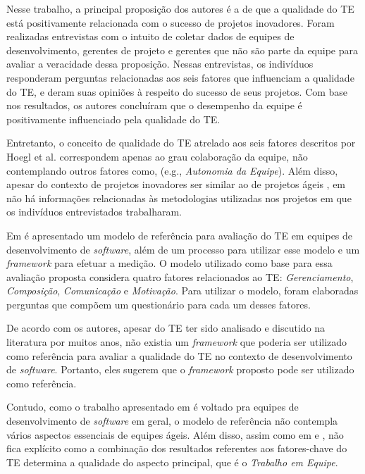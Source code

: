 Nesse trabalho, a principal proposição dos autores é a de que a qualidade do TE está positivamente relacionada com o sucesso de projetos inovadores. Foram realizadas entrevistas com o intuito de coletar dados de equipes de desenvolvimento, gerentes de projeto e gerentes que não são parte da equipe para avaliar a veracidade dessa proposição. Nessas entrevistas, os indivíduos responderam perguntas relacionadas aos seis fatores que influenciam a qualidade do TE, e deram suas opiniões à respeito do sucesso de seus projetos. Com base nos resultados, os autores concluíram que o desempenho da equipe é positivamente influenciado pela qualidade do TE.

Entretanto, o conceito de qualidade do TE atrelado aos seis fatores descritos por Hoegl et al. \cite{hoegl} correspondem apenas ao grau colaboração da equipe, não contemplando outros fatores como, (e.g., \textit{Autonomia da Equipe}). Além disso, apesar do contexto de projetos inovadores ser similar ao de projetos ágeis \cite{freire}, em \cite{hoegl} não há informações relacionadas às metodologias utilizadas nos projetos em que os indivíduos entrevistados trabalharam.

Em \cite{amengual} é apresentado um modelo de referência para avaliação do TE em equipes de desenvolvimento de \textit{software}, além de um processo para utilizar esse modelo e um \textit{framework} para efetuar a medição. O modelo utilizado como base para essa avaliação proposta considera quatro fatores relacionados ao TE: \textit{Gerenciamento}, \textit{Composição}, \textit{Comunicação} e \textit{Motivação}. Para utilizar o modelo, foram elaboradas perguntas que compõem um questionário para cada um desses fatores.

De acordo com os autores, apesar do TE ter sido analisado e discutido na literatura por muitos anos, não existia um \textit{framework} que poderia ser utilizado como referência para avaliar a qualidade do TE no contexto de desenvolvimento de \textit{software}. Portanto, eles sugerem que o \textit{framework} proposto pode ser utilizado como referência.

Contudo, como o trabalho apresentado em \cite{amengual} é voltado pra equipes de desenvolvimento de \textit{software} em geral, o modelo de referência não contempla vários aspectos essenciais de equipes ágeis. Além disso, assim como em \cite{moe} e \cite{hoegl}, não fica explícito como a combinação dos resultados referentes aos fatores-chave do TE determina a qualidade do aspecto principal, que é o \textit{Trabalho em Equipe}.

